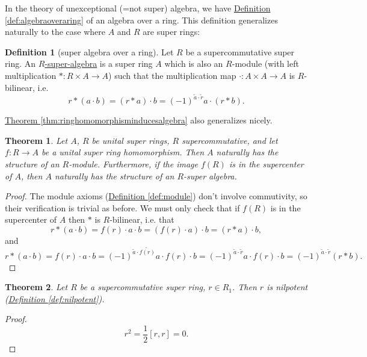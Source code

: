 \documentclass[a4paper,10pt]{scrreprt}
\newcommand{\defn}[1]{\ul{#1}}
\theoremstyle{definition}
\newtheorem{definition}{Definition}[section]
\theoremstyle{plain}
\newtheorem{theorem}{Theorem}[section]
\theoremstyle{remark}
\begin{document}
In the theory of unexceptional (=not super) algebra, we have \hyperref[def:algebraoveraring]{Definition \ref*{def:algebraoveraring}} of an algebra over a ring. This definition generalizes naturally to the case where $A$ and $R$ are super rings:
\begin{definition}[super algebra over a ring]
  \label{def:superalgebraoveraring}
  Let $R$ be a supercommutative super ring. An \defn{$R$-super-algebra} is a super ring $A$ which is also an $R$-module (with left multiplication $*\colon R \times A \to A$) such that the multiplication map $\cdot \colon A \times A \to A$ is $R$-bilinear, i.e.
  \begin{equation*}
    r*(a\cdot b) = (r*a)\cdot b = (-1)^{\tilde{a}\cdot \tilde{r}} a\cdot (r*b).
  \end{equation*}
\end{definition}
\hyperref[thm:ringhomomorphisminducesalgebra]{Theorem \ref*{thm:ringhomomorphisminducesalgebra}} also generalizes nicely.
\begin{theorem}
  Let $A$, $R$ be unital super rings, $R$ supercommutative, and let $f\colon R \to A$ be a unital super ring homomorphism. Then $A$ naturally has the structure of an $R$-module. Furthermore, if the image $f(R)$ is in the supercenter of $A$, then $A$ naturally has the structure of an $R$-super algebra.
\end{theorem}
\begin{proof}
  The module axioms (\hyperref[def:module]{Definition \ref*{def:module}}) don't involve commutivity, so their verification is trivial as before. We must only check that if $f(R)$ is in the supercenter of $A$ then $*$ is $R$-bilinear, i.e. that
  \begin{equation*}
    r*(a\cdot b) = f(r)\cdot a\cdot b = (f(r)\cdot a)\cdot b = (r*a)\cdot b,
  \end{equation*}
  and
  \begin{equation*}
    r*(a\cdot b) = f(r)\cdot a\cdot b = (-1)^{ \tilde{a}\cdot \widetilde{f(r)}}a\cdot f(r)\cdot b = (-1)^{\tilde{a}\cdot \tilde{r}}a\cdot f(r)\cdot b = (-1)^{\tilde{a}\cdot \tilde{r}}(r*b).
  \end{equation*}
\end{proof}

\begin{theorem}
  Let $R$ be a supercommutative super ring, $r \in R_{1}$. Then $r$ is nilpotent (\hyperref[def:nilpotent]{Definition \ref*{def:nilpotent}}).
\end{theorem}
\begin{proof}
  \begin{equation*}
    r^2 = \frac{1}{2}[r,r] = 0.
  \end{equation*}
\end{proof}
\end{document}

